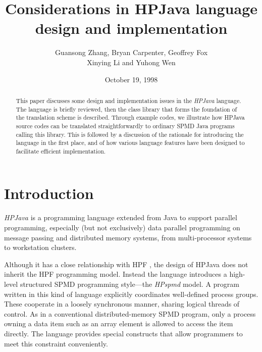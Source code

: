 





\title{Considerations in HPJava language design and implementation}

\author{Guansong Zhang, Bryan Carpenter, Geoffrey Fox\\
       Xinying Li and Yuhong Wen}


\date{October 19, 1998}

\maketitle

\begin{abstract}
This paper discusses some design and implementation issues in
the \emph{HPJava} language.  The language is briefly reviewed, then the
class library that forms the foundation of the translation scheme is
described.  Through example codes, we illustrate how HPJava source
codes can be translated straightforwardly to ordinary SPMD Java
programs calling this library.  This is followed by a discussion of
the rationale for introducing the language in the first place, and of
how various language features have been designed to facilitate
efficient implementation.
\end{abstract}

\section{Introduction}
\label{sec:introduction}

\emph{HPJava} is a programming language extended from Java to support
parallel programming, especially (but not exclusively) data parallel
programming on message passing and distributed memory systems, from
multi-processor systems to workstation clusters.

Although it has a close relationship with HPF \cite{HPFStandard}, the design
of HPJava does not inherit the HPF programming model.  Instead the
language introduces a high-level structured SPMD programming
style---the \emph{HPspmd} model.  A program written in this kind of
language explicitly coordinates well-defined process groups.  These
cooperate in a loosely synchronous manner, sharing logical threads of
control.  As in a conventional distributed-memory SPMD program, only a
process owning a data item such as an array element is allowed to
access the item directly.  The language provides special constructs
that allow programmers to meet this constraint conveniently.

